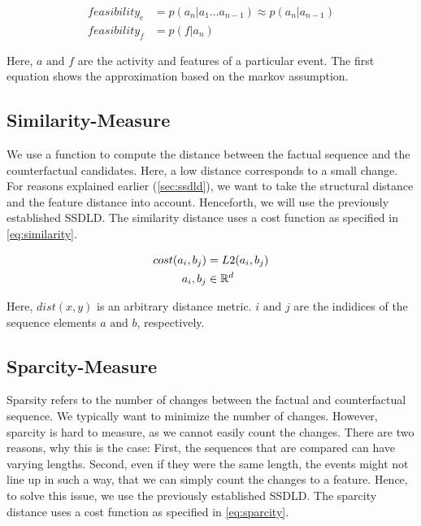 \documentclass[./../../paper.tex]{subfiles}
\begin{document}
\begin{align}
    \label{eq:feasibility}
    feasibility_e & =p(a_n|a_1\ldots a_{n-1}) \approx  p(a_n|a_{n-1}) \\
    feasibility_f & =p(f|a_n)
\end{align}

\noindent Here, $a \text{ and } f$ are the activity and features of a particular event. The first equation shows the approximation based on the markov assumption. 

\subsection{Similarity-Measure}
We use a function to compute the distance between the factual sequence and the counterfactual candidates. Here, a low distance corresponds to a small change. For reasons explained earlier (\autoref{sec:ssdld}), we want to take the structural distance and the feature distance into account. Henceforth, we will use the previously established \gls{SSDLD}. 
The similarity distance uses a cost function as specified in \autoref{eq:similarity}.

\begin{align}
    \label{eq:similarity}
    cost(a_i, b_j)      & = L2(a_i, b_j) \\
    a_i,b_j        & \in \mathbb{R}^d \nonumber
\end{align}

\noindent Here, $dist(x,y)$ is an arbitrary distance metric. $i \text{ and } j$ are the indidices of the sequence elements $a \text{ and } b$, respectively.

\subsection{Sparcity-Measure}
Sparsity refers to the number of changes between the factual and counterfactual sequence. We typically want to minimize the number of changes. However, sparcity is hard to measure, as we cannot easily count the changes. There are two reasons, why this is the case: First, the sequences that are compared can have varying lengths. Second, even if they were the same length, the events might not line up in such a way, that we can simply count the changes to a feature. Hence, to solve this issue, we use the previously established \gls{SSDLD}. The sparcity distance uses a cost function as specified in \autoref{eq:sparcity}.
\end{document}
